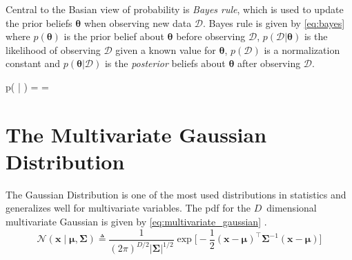 Central to the Basian view of probability is \textit{Bayes rule}, which is used to update the prior beliefs $\boldsymbol{\theta}$ when observing new data $\mathcal{D}$. Bayes rule is given by \cref{eq:bayes} where $p(\boldsymbol{\theta})$ is the prior belief about $\boldsymbol{\theta}$ before observing $\mathcal{D}$, $p(\mathcal{D} | \boldsymbol{\theta})$ is the likelihood of observing $\mathcal{D}$ given a known value for $\boldsymbol{\theta}$, $p(\mathcal{D})$ is a normalization constant and $p(\boldsymbol{\theta} | \mathcal{D})$ is the \textit{posterior} beliefs about $\boldsymbol{\theta}$ after observing $\mathcal{D}$. 
\begin{tcolorbox}[ams equation, title={Bayes Rule}]\label{eq:bayes}
    p(\boldsymbol{\theta} | ) =  = 
\end{tcolorbox}

\section{The Multivariate Gaussian Distribution}
The Gaussian Distribution is one of the most used distributions in statistics \cite{murphy} and generalizes well for multivariate variables. The pdf for the $D$ dimensional multivariate Gaussian is given by \cref{eq:multivariate_gaussian} \cite{murphy,rasmussen}.
\begin{equation}\label{eq:multivariate_gaussian}
    \mathcal{N}(\boldsymbol{x} \; | \; \boldsymbol{\mu}, \boldsymbol{\Sigma}) \triangleq \frac{1}{(2 \pi)^{D/2} |\boldsymbol{\Sigma} | ^{1/2}} \exp \bigg[- \frac{1}{2} (\boldsymbol{x} - \boldsymbol{\mu})^\intercal \boldsymbol{\Sigma}^{-1}(\boldsymbol{x} - \boldsymbol{\mu})\bigg]
\end{equation}
